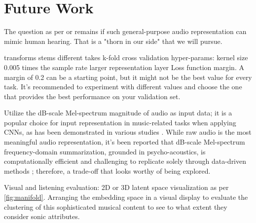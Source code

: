 \chapter{Future Work}

The question as per \cite{Turian2022HEAR:Representations} or \cite{Li2023MERT:Training} remains if such general-purpose audio representation can mimic human hearing. That is a "thorn in our side" that we will pursue.

transforms
stems
different takes
k-fold cross validation
hyper-params: kernel size 0.005 times the sample rate
larger representation layer
Loss function margin. A margin of 0.2 can be a starting point, but it might not be the best value for every task. It's recommended to experiment with different values and choose the one that provides the best performance on your validation set.

Utilize the dB-scale Mel-spectrum magnitude of audio as input data; it is a popular choice for input representation in music-related tasks when applying CNNs, as has been demonstrated in various studies \cite{Kim2020OneStrategies}. While raw audio is the most meaningful audio representation, it's been reported that dB-scale Mel-spectrum frequency-domain summarization, grounded in psycho-acoustics, is computationally efficient and challenging to replicate solely through data-driven methods \cite{Kim2020OneStrategies}; therefore, a trade-off that looks worthy of being explored.

Visual and listening evaluation: 2D or 3D latent space visualization as per \ref{fig:manifold}. Arranging the embedding space in a visual display to evaluate the clustering of this sophisticated musical content to see to what extent they consider sonic attributes. 



\newpage